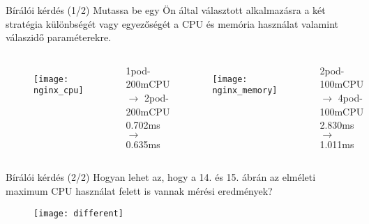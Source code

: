 \documentclass{beamer}
\begin{document}
	



\begin{frame}[t]{Bírálói kérdés (1/2)}
Mutassa be egy Ön által választott alkalmazásra a két stratégia különbségét vagy egyezőségét a CPU és memória használat valamint válaszidő paraméterekre.
\begin{columns}
	\begin{figure}
	\centering
	\texttt{[image: nginx\_cpu]}
	\end{figure}
	\small
	\centering
	1pod-200mCPU $\rightarrow$ 2pod-200mCPU
	0.702ms $\rightarrow$ 0.635ms
	\begin{figure}
	\centering
	\texttt{[image: nginx\_memory]}
	\end{figure}
	\small
	\centering
	2pod-100mCPU $\rightarrow$ 4pod-100mCPU
	2.830ms $\rightarrow$ 1.011ms
\end{columns}
\end{frame}


\begin{frame}[t]{Bírálói kérdés (2/2)}
Hogyan lehet az, hogy a 14. és 15. ábrán az elméleti maximum CPU használat felett is vannak mérési
eredmények?
\begin{figure}
	\centering
	\texttt{[image: different]}
\end{figure}
\end{frame}
\end{document}
